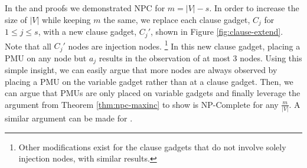 In the \xvalpart and \maxinc proofs we demonstrated NPC for $m=|V|-s$.
In order to increase the size of $|V|$ while keeping $m$ the same, we replace each clause gadget, $C_j$ for $1 \leq j \leq s$, with a new clause gadget, $C_j'$,
shown in Figure \ref{fig:clause-extend}.  Note that all $C_j'$ nodes are injection nodes. 
{\footnote {\small Other modifications exist for the clause gadgets that do not involve solely injection nodes, with similar results.}}
In this new clause gadget, placing a PMU on any node but $a_j$ results in the observation of at most $3$ nodes.
Using this simple insight, we can easily argue that more nodes are always observed by placing a PMU on the variable gadget
rather than at a clause gadget. Then, we can argue that PMUs are only placed on variable gadgets and finally leverage the
argument from Theorem \ref{thm:npc-maxinc} to show \maxinc is NP-Complete for any $\frac{m}{|V|}$. A similar argument can be made for \xvalparts. 



